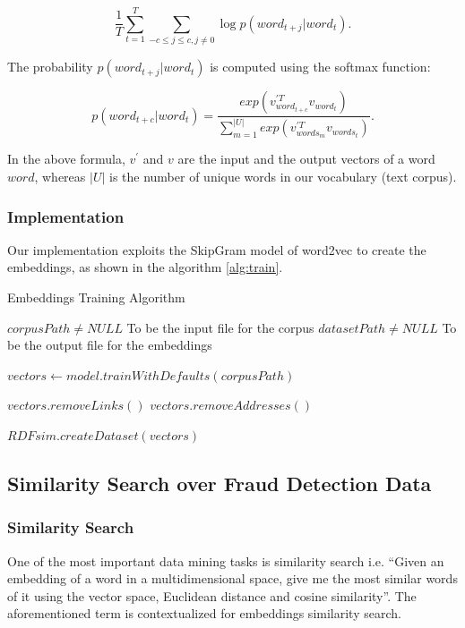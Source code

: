 \documentclass[sigconf, nonacm]{acmart}
\begin{document}
\begin{equation}
\frac{1}{T} \sum_{t=1}^{T} \sum_{-c\leq j \leq c, j\neq 0}^{} \log{p(word_{t+j}|word_t)}.
\end{equation}

The probability $p(word_{t+j}|word_t)$ is computed using the softmax function:

\begin{equation}
p(word_{t+c}|word_t)=\frac{exp(v^{\prime T}_{word_{t+c}} v_{word_t})}{\sum_{m=1}^{|U|} exp(v^{\prime T}_{words_{m}} v_{words_t})}.
\end{equation}

In the above formula, $v^{\prime}$ and $v$
are the input and the output vectors of a word $word$, whereas $|U|$ is the number of unique words in our vocabulary (text corpus). \\
\subsubsection{Implementation} 
Our implementation exploits the SkipGram model of word2vec to create the embeddings, as shown in the algorithm \ref{alg:train}.
\begin{algorithm}
\caption{Embeddings Training Algorithm}\label{alg:train}
\begin{algorithmic}

\Require $corpusPath \neq NULL$ To be the input file for the corpus
\Require $datasetPath \neq NULL$ To be the output file for the embeddings

\State $vectors \gets model.trainWithDefaults(corpusPath)$

\State $vectors.removeLinks()$
\State $vectors.removeAddresses()$

\State $RDFsim.createDataset(vectors)$

\end{algorithmic}
\end{algorithm}

\subsection{Similarity Search over Fraud Detection Data}
\subsubsection{Similarity Search}  
One of the most important data mining tasks is similarity search i.e. “Given an embedding of a word in a multidimensional space, give me the most similar words of it using the vector space, Euclidean distance and cosine similarity”. The aforementioned term is contextualized for embeddings similarity search.\\
\end{document}
